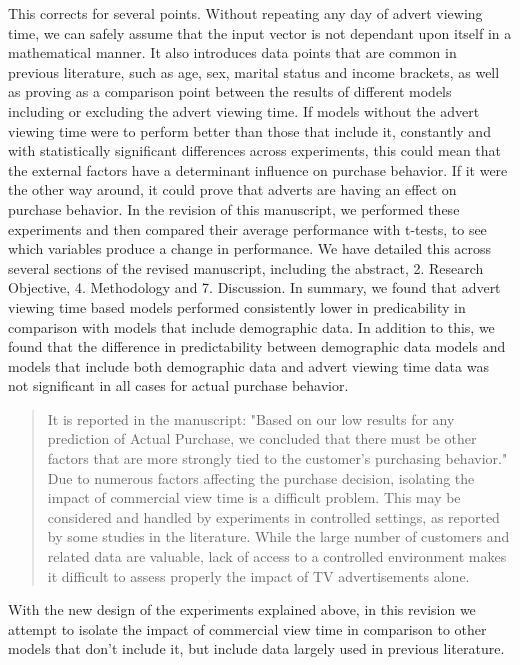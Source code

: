 \documentclass[review]{elsarticle}
\begin{document}
This corrects for several points. Without repeating any day of advert viewing time, we can safely assume that the input vector is not dependant upon itself in a mathematical manner. 
It also introduces data points that are common in previous literature, such as age, sex, marital status and income brackets, as well as proving as a comparison point between the results of different models including or excluding the advert viewing time. If models without the advert viewing time were to perform better than those that include it, constantly and with statistically significant differences across experiments, this could mean that the external factors have a determinant influence on purchase behavior. If it were the other way around, it could prove that adverts are having an effect on purchase behavior. In the revision of this manuscript, we performed these experiments and then compared their average performance with t-tests, to see which variables produce a change in performance. We have detailed this across several sections of the revised manuscript, including the abstract, 2. Research Objective, 4. Methodology and 7. Discussion. In summary, we found that advert viewing time based models performed consistently lower in predicability in comparison with models that include demographic data. In addition to this, we found that the difference in predictability between demographic data models and models that include both demographic data and advert viewing time data was not significant in all cases for actual purchase behavior.

\begin{quotation}
It is reported in the manuscript: "Based on our low results for any prediction of Actual Purchase, we concluded that there must be other factors that are more strongly tied to the customer’s purchasing behavior." Due to numerous factors affecting the purchase decision, isolating the impact of commercial view time is a difficult problem. This may be considered and handled by experiments in controlled settings, as reported by some studies in the literature. While the large number of customers and related data are valuable, lack of access to a controlled environment makes it difficult to assess properly the impact of TV advertisements alone.
\end{quotation}

With the new design of the experiments explained above, in this revision we attempt to isolate the impact of commercial view time in comparison to other models that don't include it, but include data largely used in previous literature.
\end{document}
